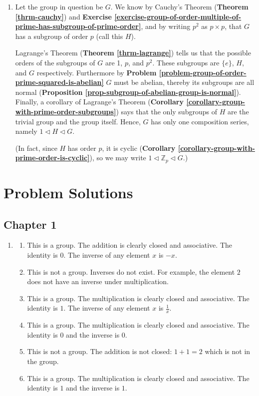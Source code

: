 \begin{enumerate}
    \item Let the group in question be $G$. We know by Cauchy's Theorem (\textbf{Theorem \ref{thrm-cauchy}}) and \textbf{Exercise \ref{exercise-group-of-order-multiple-of-prime-has-subgroup-of-prime-order}}, and by writing $p^2$ as $p \times p$, that $G$ has a subgroup of order $p$ (call this $H$).
    
    Lagrange's Theorem (\textbf{Theorem \ref{thrm-lagrange}}) tells us that the possible orders of the subgroups of $G$ are 1, $p$, and $p^2$. These subgroups are $\{e\}$, $H$, and $G$ respectively. Furthermore by \textbf{Problem \ref{problem-group-of-order-prime-squared-is-abelian}} $G$ must be abelian, thereby its subgroups are all normal (\textbf{Proposition \ref{prop-subgroup-of-abelian-group-is-normal}}). Finally, a corollary of Lagrange's Theorem (\textbf{Corollary \ref{corollary-group-with-prime-order-subgroups}}) says that the only subgroups of $H$ are the trivial group and the group itself. Hence, $G$ has only one composition series, namely $1 \lhd H \lhd G$.
    
    (In fact, since $H$ has order $p$, it is cyclic (\textbf{Corollary \ref{corollary-group-with-prime-order-is-cyclic}}), so we may write $1 \lhd \mathbb{Z}_p \lhd G$.)
\end{enumerate}
\chapter*{Problem Solutions}

\section*{Chapter 1}
\begin{enumerate}
    \item \begin{enumerate}[label=(\alph*)]
        \item This is a group. The addition is clearly closed and associative. The identity is 0. The inverse of any element $x$ is $-x$.
        \item This is not a group. Inverses do not exist. For example, the element $2$ does not have an inverse under multiplication.
        \item This is a group. The multiplication is clearly closed and associative. The identity is $1$. The inverse of any element $x$ is $\frac1x$.
        \item This is a group. The multiplication is clearly closed and associative. The identity is $0$ and the inverse is $0$.
        \item This is not a group. The addition is not closed: $1 + 1 = 2$ which is not in the group.
        \item This is a group. The multiplication is clearly closed and associative. The identity is $1$ and the inverse is $1$.
    \end{enumerate}
\end{enumerate}

